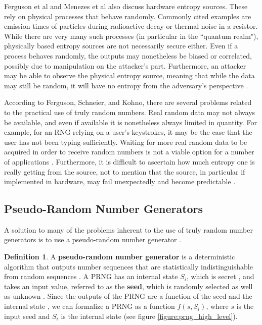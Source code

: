 \documentclass[12pt, titlepage]{report}
\theoremstyle{definition}
\newtheorem{definition}{Definition}
\begin{document}
Ferguson et al and Menezes et al also discuss hardware entropy sources. These rely on physical processes that behave randomly. Commonly cited examples are emission times of particles during radioactive decay or thermal noise in a resistor. While there are very many such processes (in particular in the ``quantum realm"), physically based entropy sources are not necessarily secure either. Even if a process behaves randomly, the outputs may nonetheless be biased or correlated, possibly due to manipulation on the attacker's part. Furthermore, an attacker may be able to observe the physical entropy source, meaning that while the data may still be random, it will have no entropy from the adversary's perspective \cite[p. 138-139]{ferguson2010cryptography} \cite[p. 172]{menezes1996handbook}.

According to Ferguson, Schneier, and Kohno, there are several problems related to the practical use of truly random numbers. Real random data may not always be available, and even if available it is nonetheless always limited in quantity. For example, for an RNG relying on a user's keystrokes, it may be the case that the user has not been typing sufficiently. Waiting for more real random data to be acquired in order to receive random numbers is not a viable option for a number of applications \cite[p. 139]{ferguson2010cryptography}. Furthermore, it is difficult to ascertain how much entropy one is really getting from the source, not to mention that the source, in particular if implemented in hardware, may fail unexpectedly and become predictable \cite{ferguson2010cryptography}.



\subsection{Pseudo-Random Number Generators}\label{subsection:prngs}
A solution to many of the problems inherent to the use of truly random number generators is to use a pseudo-random number generator \cite[p. 140]{ferguson2010cryptography}.

\begin{definition}
 A \textbf{pseudo-random number generator} is a deterministic algorithm that outputs number sequences that are statistically indistinguishable from random sequences \cite{menezes1996handbook}. A PRNG has an internal state $S_i$, which is secret \cite{kelsey1998cryptanalytic}, and takes an input value, referred to as the \textbf{seed}, which is randomly selected as well as unknown \cite[s. 1.1.4]{rukhin2001statistical}. Since the outputs of the PRNG are a function of the seed and the internal state \cite{kelsey1998cryptanalytic} \cite[s 1.1.4]{rukhin2001statistical}, we can formalize a PRNG as a function $f(s, S_i)$, where $s$ is the input seed and $S_i$ is the internal state (see figure \ref{figure:prng_high_level}).
\end{definition}
\end{document}
